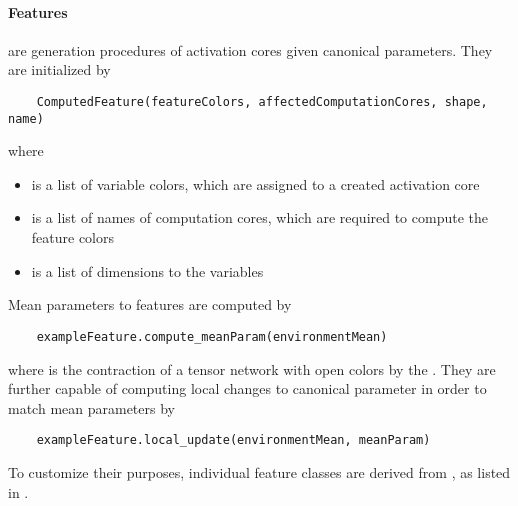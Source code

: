 \paragraph{Features} are generation procedures of activation cores given canonical parameters.
They are initialized by
\begin{lstlisting}
    ComputedFeature(featureColors, affectedComputationCores, shape, name)
\end{lstlisting}
where
\begin{itemize}
    \item {} is a list of  variable colors, which are assigned to a created activation core
    \item {} is a list of  names of computation cores, which are required to compute the feature colors
    \item {} is a list of  dimensions to the variables
\end{itemize}
Mean parameters to features are computed by
\begin{lstlisting}
    exampleFeature.compute_meanParam(environmentMean)
\end{lstlisting}
where  is the contraction of a tensor network with open colors by the .
They are further capable of computing local changes to canonical parameter in order to match mean parameters by
\begin{lstlisting}
    exampleFeature.local_update(environmentMean, meanParam)
\end{lstlisting}
To customize their purposes, individual feature classes are derived from , as listed in .

